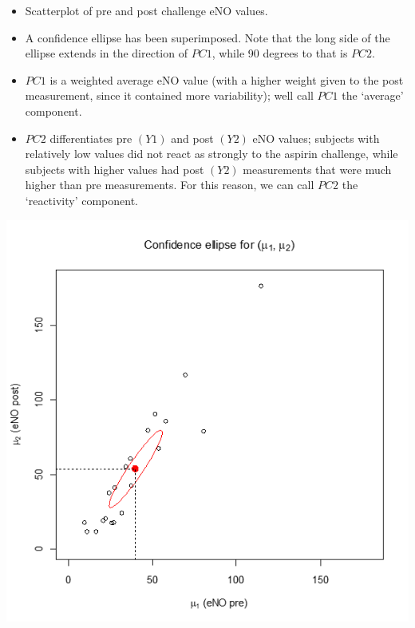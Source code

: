 \documentclass[
  9pt,
  ignorenonframetext,
]{beamer}
\providecommand{\tightlist}{%
  \setlength{\itemsep}{0pt}\setlength{\parskip}{0pt}}
\begin{document}
\begin{frame}{}
\protect\hypertarget{section-9}{}
\begin{itemize}
\tightlist
\item
  Scatterplot of pre and post challenge eNO values.
\item
  A confidence ellipse has been superimposed. Note that the long side of
  the ellipse extends in the direction of \(PC1\), while 90 degrees to
  that is \(PC2\).
\item
  \(PC1\) is a weighted average eNO value (with a higher weight given to
  the post measurement, since it contained more variability); well call
  \(PC1\) the `average' component.
\item
  \(PC2\) differentiates pre \((Y1)\) and post \((Y2)\) eNO values;
  subjects with relatively low values did not react as strongly to the
  aspirin challenge, while subjects with higher values had post \((Y2)\)
  measurements that were much higher than pre measurements. For this
  reason, we can call \(PC2\) the `reactivity' component. \tiny
\end{itemize}

\begin{center}\includegraphics[width=0.4\linewidth]{figs_L2/L2-f19} \end{center}

\tiny
\end{frame}
\end{document}
